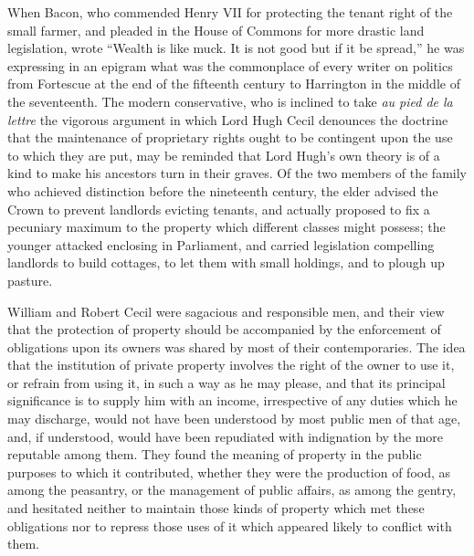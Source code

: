 \documentclass{book}
\begin{document}
When Bacon, who commended Henry VII for protecting the tenant right of the small farmer, and pleaded in the House of Commons for more drastic land legislation, wrote “Wealth is like muck. It is not good but if it be spread,” he was expressing in an epigram what was the commonplace of every writer on politics from Fortescue at the end of the fifteenth century to Harrington in the middle of the seventeenth. The modern conservative, who is inclined to take \emph{au pied de la lettre} the vigorous argument in which Lord Hugh Cecil denounces the doctrine that the maintenance of proprietary rights ought to be contingent upon the use to which they are put, may be reminded that Lord Hugh’s own theory is of a kind to make his ancestors turn in their graves. Of the two members of the family who achieved distinction before the nineteenth century, the elder advised the Crown to prevent landlords evicting tenants, and actually proposed to fix a pecuniary maximum to the property which different classes might possess; the younger attacked enclosing in Parliament, and carried legislation compelling landlords to build cottages, to let them with small holdings, and to plough up pasture.\footnotemark[1]

William and Robert Cecil were sagacious and responsible men, and their view that the protection of property should be accompanied by the enforcement of obligations upon its owners was shared by most of their contemporaries. The idea that the institution of private property involves the right of the owner to use it, or refrain from using it, in such a way as he may please, and that its principal significance is to supply him with an income, irrespective of any duties which he may discharge, would not have been understood by most public men of that age, and, if understood, would have been repudiated with indignation by the more reputable among them. They found the meaning of property in the public purposes to which it contributed, whether they were the production of food, as among the peasantry, or the management of public affairs, as among the gentry, and hesitated neither to maintain those kinds of property which met these obligations nor to repress those uses of it which appeared likely to conflict with them.
\end{document}
